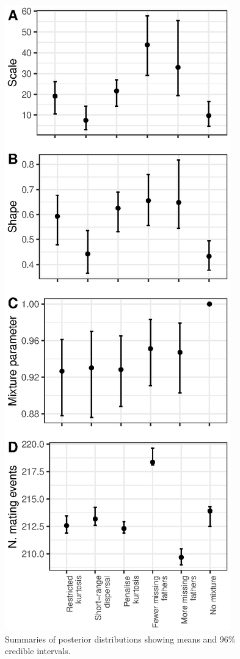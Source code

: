 \documentclass[10pt, a4paper, twocolumn]{article} %
\begin{document}
\begin{figure}
\includegraphics{posterior_distributions.eps}
\caption{Summaries of posterior distributions showing means and 96\% credible intervals.}
\label{posterior_summaries}
\end{figure}
\end{document}
